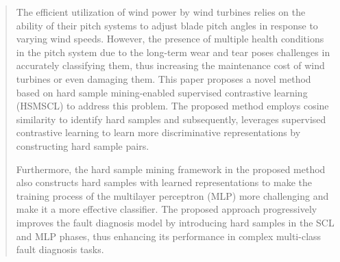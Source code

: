 \documentclass[lettersize,journal]{IEEEtran}
\begin{document}

\maketitle

\begin{abstract}
The efficient utilization of wind power by wind turbines relies on the ability of their pitch systems to adjust blade pitch angles in response to varying wind speeds. However, the presence of multiple health conditions in the pitch system due to the long-term wear and tear poses challenges in accurately classifying them, thus increasing the maintenance cost of wind turbines or even damaging them. This paper proposes a novel method based on hard sample mining-enabled supervised contrastive learning (HSMSCL) to address this problem. The proposed method employs cosine similarity to identify hard samples and subsequently, leverages supervised contrastive learning to learn more discriminative representations by constructing hard sample pairs. 

Furthermore, the hard sample mining framework in the proposed method also constructs hard samples with learned representations to make the training process of the multilayer perceptron (MLP) more challenging and make it a more effective classifier.
The proposed approach progressively improves the fault diagnosis model by introducing hard samples in the SCL and MLP phases, thus enhancing its performance in complex multi-class fault diagnosis tasks.


\end{abstract}
\end{document}

